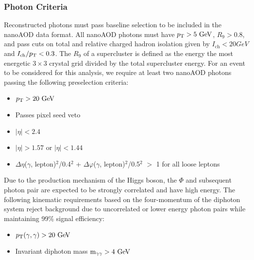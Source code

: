 \subsubsection{Photon Criteria} \label{sec:ana_photons}
Reconstructed photons must pass baseline selection to be included in the nanoAOD data format. All nanoAOD photons must have $\pt>5\unit{GeV}$, $R_9>0.8$, and pass cuts on total and relative charged hadron isolation given by $I_\text{ch}<20\unit{GeV}$ and $I_\text{ch}/\pt<0.3$. The $R_9$ of a supercluster is defined as the energy the most energetic $3\times3$ crystal grid divided by the total supercluster energy. For an event to be considered for this analysis, we require at least two nanoAOD photons passing the following preselection criteria:
\begin{itemize}
	\item $\pt>20\unit{GeV}$
	\item Passes pixel seed veto
	\item $|\eta|<2.4$
	\item $|\eta|>1.57\text{ or }|\eta|<1.44$
	\item $\Delta\eta$($\gamma$, lepton)$^2$/0.4$^2$ + $\Delta\varphi$($\gamma$, lepton)$^2$/0.5$^2$ $>$ 1 for all loose leptons
\end{itemize}

Due to the production mechanism of the Higgs boson, the $\Phi$ and subsequent photon pair are expected to be strongly correlated and have high energy. The following kinematic requirements based on the four-momentum of the diphoton system reject background due to uncorrelated or lower energy photon pairs while maintaining 99\% signal efficiency:
\begin{itemize}
	\item $\pt(\gamma,\gamma)>20\unit{GeV}$
	\item Invariant diphoton mass $\mgg>4\unit{GeV}$
\end{itemize}

